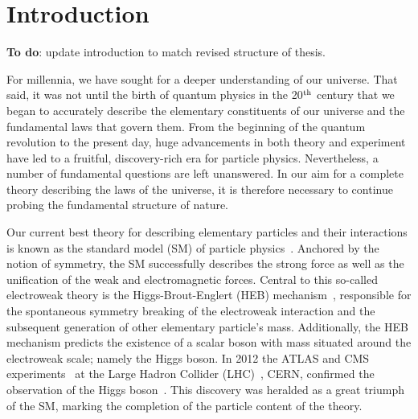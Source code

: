 \chapter{Introduction}
\label{chap:intro}

\textbf{To do}: update introduction to match revised structure of thesis.

For millennia, we have sought for a deeper understanding of our universe. That said, it was not until the birth of quantum physics in the 20$^{\rm{th}}$ century that we began to accurately describe the elementary constituents of our universe and the fundamental laws that govern them. From the beginning of the quantum revolution to the present day, huge advancements in both theory and experiment have led to a fruitful, discovery-rich era for particle physics. Nevertheless, a number of fundamental questions are left unanswered. In our aim for a complete theory describing the laws of the universe, it is therefore necessary to continue probing the fundamental structure of nature.

Our current best theory for describing elementary particles and their interactions is known as the standard model (SM) of particle physics~\cite{Glashow:1961tr,Weinberg:1967tq,Salam:1968rm}. Anchored by the notion of symmetry, the SM successfully describes the strong force as well as the unification of the weak and electromagnetic forces. Central to this so-called electroweak theory is the Higgs-Brout-Englert (HEB) mechanism~\cite{Englert:1964et,HIGGS1964132,Higgs:1964pj,Guralnik:1964eu,PhysRev.145.1156,PhysRev.155.1554}, responsible for the spontaneous symmetry breaking of the electroweak interaction and the subsequent generation of other elementary particle's mass. Additionally, the HEB mechanism predicts the existence of a scalar boson with mass situated around the electroweak scale; namely the Higgs boson. In 2012 the ATLAS and CMS experiments~\cite{Aad:2008zzm,Chatrchyan:2008zzk} at the Large Hadron Collider (LHC)~\cite{1748-0221-3-08-S08001}, CERN, confirmed the observation of the Higgs boson~\cite{Aad:2012tfa,Chatrchyan:2012xdj,Chatrchyan:2013lba}. This discovery was heralded as a great triumph of the SM, marking the completion of the particle content of the theory.

